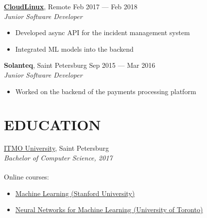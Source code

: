 \documentclass[margin]{cv}
\begin{document}
\begin{resume}
\href{https://www.cloudlinux.com}{\bf CloudLinux}, Remote \hfill Feb 2017 --- Feb 2018 \\
{\sl Junior Software Developer}
\begin{itemize}
    \itemsep-2pt
    \itemindent-10pt
	\item Developed async API for the incident management system
	\item Integrated ML models into the backend
\end{itemize}

{\bf Solanteq}, Saint Petersburg \hfill Sep 2015 --- Mar 2016 \\
{\sl Junior Software Developer}
\begin{itemize}
    \itemsep-2pt
    \itemindent-10pt
	\item Worked on the backend of the payments processing platform
\end{itemize}

\section{EDUCATION}
\href{https://en.itmo.ru}{ITMO University}, Saint Petersburg \\
{\sl Bachelor of Computer Science, 2017} \\\\
Online courses:
\begin{itemize}
    \itemsep-2pt
    \itemindent-10pt
    \item \href{https://www.coursera.org/account/accomplishments/verify/NAC3H6WDW9TL}{Machine Learning (Stanford University)}
    \item \href{https://www.coursera.org/account/accomplishments/verify/2LMELT5R6D25}{Neural Networks for Machine Learning (University of Toronto)}
\end{itemize}

\end{resume}
\end{document}
